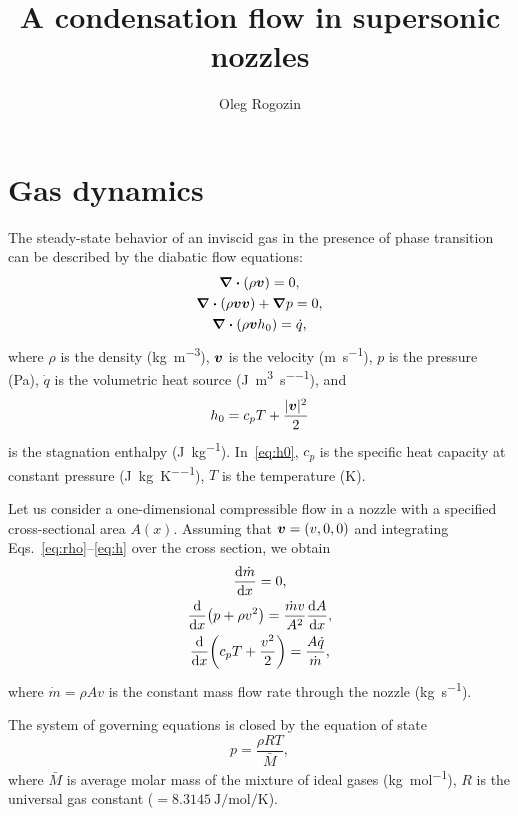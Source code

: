 \documentclass{article}
\title{A condensation flow in supersonic nozzles}
\author{Oleg Rogozin}
\newcommand{\bv}{\vb*{v}}
\begin{document}
\maketitle
\tableofcontents

\section{Gas dynamics}

The steady-state behavior of an inviscid gas in the presence of phase transition
can be described by the diabatic flow equations:
\begin{gather}
    \div(\rho\bv) = 0, \label{eq:rho}\\
    \div(\rho\bv\bv) + \grad{p} = 0, \label{eq:v}\\
    \div(\rho\bv h_0) = \dot{q}, \label{eq:h}
\end{gather}
where $\rho$ is the density (\si{\kg\per\cubic\m}), $\bv$ is the velocity (\si{\m\per\s}),
$p$ is the pressure (\si{\Pa}), $\dot{q}$ is the volumetric heat source (\si{\J\per\cubic\m\per\s}), and
\begin{equation}\label{eq:h0}
    h_0 = c_pT + \frac{|\bv|^2}{2}
\end{equation}
is the stagnation enthalpy (\si{\J\per\kg}). In~\eqref{eq:h0},
$c_p$ is the specific heat capacity at constant pressure (\si{\J\per\kg\per\K}), $T$ is the temperature (\si{\K}).

Let us consider a one-dimensional compressible flow in a nozzle with a specified cross-sectional area $A(x)$.
Assuming that $\bv = (v,0,0)$ and integrating Eqs.~\eqref{eq:rho}--\eqref{eq:h} over the cross section, we obtain
\begin{gather}
    \dv{\dot{m}}{x} = 0, \label{eq:continuity}\\
    \dv{x}(p + \rho v^2) = \frac{\dot{m}v}{A^2}\dv{A}{x}, \label{eq:momentum}\\
    \dv{x}(c_pT + \frac{v^2}{2}) = \frac{A\dot{q}}{\dot{m}}, \label{eq:energy}
\end{gather}
where $\dot{m} = \rho Av$ is the constant mass flow rate through the nozzle (\si{\kg\per\s}).

The system of governing equations is closed by the equation of state
\begin{equation}\label{eq:eos}
    p = \frac{\rho RT}{\bar{M}},
\end{equation}
where $\bar{M}$ is average molar mass of the mixture of ideal gases (\si{\kg\per\mol}),
$R$ is the universal gas constant ($= \SI{8.3145}{\J\per\mol\per\K}$).
\end{document}

